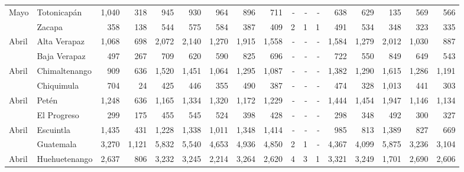 \begin{landscape}
\begin{center}
\begin{longtable}{llrrrrrrrrrrrrrrr}
\multicolumn{1}{l}{	\footnotesize	 Mayo 	}&	 Totonicapán 	&	 1,040 	&	 318 	&	 945 	&	 930 	&	 964 	&	 896 	&	 711 	&	 -   	&	 -   	&	 -   	&	 638 	&	 629 	&	 135 	&	 569 	&	 566 	\\
\rowcolor{color1!5!white}\multicolumn{1}{l}{	\footnotesize	 Mayo 	}&	 Zacapa 	&	 358 	&	 138 	&	 544 	&	 575 	&	 584 	&	 387 	&	 409 	&	 2 	&	 1 	&	 1 	&	 491 	&	 534 	&	 348 	&	 323 	&	 335 	\\
\multicolumn{1}{l}{	\footnotesize	 Abril 	}&	 Alta Verapaz 	&	 1,068 	&	 698 	&	 2,072 	&	 2,140 	&	 1,270 	&	 1,915 	&	 1,558 	&	 -   	&	 -   	&	 -   	&	 1,584 	&	 1,279 	&	 2,012 	&	 1,030 	&	 887 	\\
\rowcolor{color1!5!white}\multicolumn{1}{l}{	\footnotesize	 Abril 	}&	 Baja Verapaz 	&	 497 	&	 267 	&	 709 	&	 620 	&	 590 	&	 825 	&	 696 	&	 -   	&	 -   	&	 -   	&	 722 	&	 550 	&	 849 	&	 649 	&	 543 	\\
\multicolumn{1}{l}{	\footnotesize	 Abril 	}&	 Chimaltenango 	&	 909 	&	 636 	&	 1,520 	&	 1,451 	&	 1,064 	&	 1,295 	&	 1,087 	&	 -   	&	 -   	&	 -   	&	 1,382 	&	 1,290 	&	 1,615 	&	 1,286 	&	 1,191 	\\
\rowcolor{color1!5!white}\multicolumn{1}{l}{	\footnotesize	 Abril 	}&	 Chiquimula 	&	 704 	&	 24 	&	 425 	&	 446 	&	 355 	&	 490 	&	 387 	&	 -   	&	 -   	&	 -   	&	 474 	&	 328 	&	 1,013 	&	 441 	&	 303 	\\
\multicolumn{1}{l}{	\footnotesize	 Abril 	}&	 Petén 	&	 1,248 	&	 636 	&	 1,165 	&	 1,334 	&	 1,320 	&	 1,172 	&	 1,229 	&	 -   	&	 -   	&	 -   	&	 1,444 	&	 1,454 	&	 1,947 	&	 1,146 	&	 1,134 	\\
\rowcolor{color1!5!white}\multicolumn{1}{l}{	\footnotesize	 Abril 	}&	 El Progreso 	&	 299 	&	 175 	&	 455 	&	 545 	&	 524 	&	 398 	&	 428 	&	 -   	&	 -   	&	 -   	&	 298 	&	 348 	&	 492 	&	 300 	&	 327 	\\
\multicolumn{1}{l}{	\footnotesize	 Abril 	}&	 Escuintla 	&	 1,435 	&	 431 	&	 1,228 	&	 1,338 	&	 1,011 	&	 1,348 	&	 1,414 	&	 -   	&	 -   	&	 -   	&	 985 	&	 813 	&	 1,389 	&	 827 	&	 669 	\\
\rowcolor{color1!5!white}\multicolumn{1}{l}{	\footnotesize	 Abril 	}&	 Guatemala 	&	 3,270 	&	 1,121 	&	 5,832 	&	 5,540 	&	 4,653 	&	 4,936 	&	 4,850 	&	 2 	&	 1 	&	 -   	&	 4,367 	&	 4,099 	&	 5,875 	&	 3,236 	&	 3,104 	\\
\multicolumn{1}{l}{	\footnotesize	 Abril 	}&	 Huehuetenango 	&	 2,637 	&	 806 	&	 3,232 	&	 3,245 	&	 2,214 	&	 3,264 	&	 2,620 	&	 4 	&	 3 	&	 1 	&	 3,321 	&	 3,249 	&	 1,701 	&	 2,690 	&	 2,606 	\\

\end{longtable}
\end{center}
\end{landscape}

